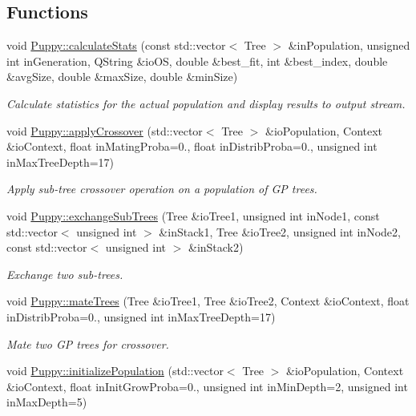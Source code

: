 \subsection*{Functions}
\begin{DoxyCompactItemize}
\item 
void \hyperlink{group__Puppy_gaaef144c802e721c9f3ef0a53b8728d3d}{Puppy\+::calculate\+Stats} (const std\+::vector$<$ Tree $>$ \&in\+Population, unsigned int in\+Generation, Q\+String \&io\+O\+S, double \&best\+\_\+fit, int \&best\+\_\+index, double \&avg\+Size, double \&max\+Size, double \&min\+Size)
\begin{DoxyCompactList}\small\item\em Calculate statistics for the actual population and display results to output stream. \end{DoxyCompactList}\item 
void \hyperlink{group__Puppy_ga3ae29733ace7314f669f288e6f2d4a8d}{Puppy\+::apply\+Crossover} (std\+::vector$<$ Tree $>$ \&io\+Population, Context \&io\+Context, float in\+Mating\+Proba=0., float in\+Distrib\+Proba=0., unsigned int in\+Max\+Tree\+Depth=17)
\begin{DoxyCompactList}\small\item\em Apply sub-\/tree crossover operation on a population of G\+P trees. \end{DoxyCompactList}\item 
void \hyperlink{group__Puppy_gac9ce564e7c3a601bc7cb9f39def4cfc4}{Puppy\+::exchange\+Sub\+Trees} (Tree \&io\+Tree1, unsigned int in\+Node1, const std\+::vector$<$ unsigned int $>$ \&in\+Stack1, Tree \&io\+Tree2, unsigned int in\+Node2, const std\+::vector$<$ unsigned int $>$ \&in\+Stack2)
\begin{DoxyCompactList}\small\item\em Exchange two sub-\/trees. \end{DoxyCompactList}\item 
void \hyperlink{group__Puppy_gae78df624fa96e33eaf9896ae00ea13cd}{Puppy\+::mate\+Trees} (Tree \&io\+Tree1, Tree \&io\+Tree2, Context \&io\+Context, float in\+Distrib\+Proba=0., unsigned int in\+Max\+Tree\+Depth=17)
\begin{DoxyCompactList}\small\item\em Mate two G\+P trees for crossover. \end{DoxyCompactList}\item 
void \hyperlink{group__Puppy_ga965ce68758651c3b9cf03db03799f709}{Puppy\+::initialize\+Population} (std\+::vector$<$ Tree $>$ \&io\+Population, Context \&io\+Context, float in\+Init\+Grow\+Proba=0., unsigned int in\+Min\+Depth=2, unsigned int in\+Max\+Depth=5)

\end{DoxyCompactItemize}
